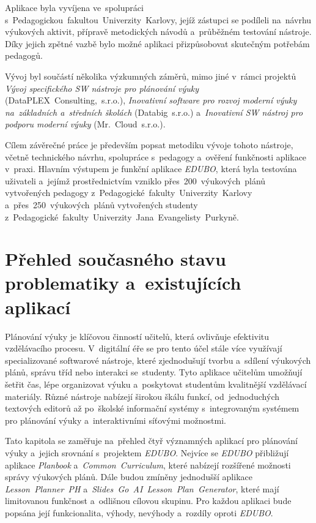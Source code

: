 \documentclass[male,czech,api_bc]{kitheses}
\begin{document}
Aplikace byla vyvíjena ve~spolupráci s~Pedagogickou~fakultou~Univerzity~Karlovy, jejíž zástupci se podíleli na~návrhu výukových aktivit, přípravě metodických návodů a~průběžném testování nástroje. Díky jejich zpětné vazbě bylo možné aplikaci přizpůsobovat skutečným potřebám pedagogů.

Vývoj byl součástí několika výzkumných záměrů, mimo jiné v~rámci projektů \textit{Vývoj specifického SW nástroje pro plánování výuky} (DataPLEX~Consulting,~s.r.o.), \textit{Inovativní software pro rozvoj moderní výuky na~základních a~středních školách} (Databig~s.r.o.) a~\textit{Inovativní SW nástroj pro podporu moderní výuky} (Mr.~Cloud~s.r.o.).

Cílem závěrečné práce je především popsat metodiku vývoje tohoto nástroje, včetně technického návrhu, spolupráce s~pedagogy a~ověření funkčnosti aplikace v~praxi. Hlavním výstupem je funkční aplikace \textit{EDUBO}, která byla testována uživateli a~jejímž prostřednictvím vzniklo přes~200~výukových~plánů vytvořených pedagogy z~Pedagogické~fakulty~Univerzity~Karlovy a~přes~250~výukových~plánů vytvořených studenty z~Pedagogické~fakulty~Univerzity~Jana~Evangelisty~Purkyně.

\chapter{Přehled současného stavu problematiky a~existujících aplikací}

Plánování výuky je klíčovou činností učitelů, která ovlivňuje efektivitu vzdělávacího procesu. V~digitální éře se pro tento účel stále více využívají specializované softwarové nástroje, které zjednodušují tvorbu a~sdílení výukových plánů, správu tříd nebo interakci se~studenty. Tyto aplikace učitelům umožňují šetřit čas, lépe organizovat výuku a~poskytovat studentům kvalitnější vzdělávací materiály. Různé nástroje nabízejí širokou škálu funkcí, od~jednoduchých textových editorů až po~školské informační systémy s~integrovaným systémem pro plánování výuky a~interaktivními síťovými možnostmi.

Tato kapitola se zaměřuje na~přehled čtyř významných aplikací pro plánování výuky a~jejich srovnání s~projektem \textit{EDUBO}. Nejvíce se \textit{EDUBO} přibližují aplikace \textit{Planbook} a~\textit{Common~Curriculum}, které nabízejí rozšířené možnosti správy výukových plánů. Dále budou zmíněny jednodušší aplikace \textit{Lesson~Planner~PH} a~\textit{Slides~Go~AI~Lesson~Plan~Generator}, které mají limitovanou funkčnost a~odlišnou cílovou skupinu. Pro každou aplikaci bude popsána její funkcionalita, výhody, nevýhody a~rozdíly oproti \textit{EDUBO}.
\end{document}
